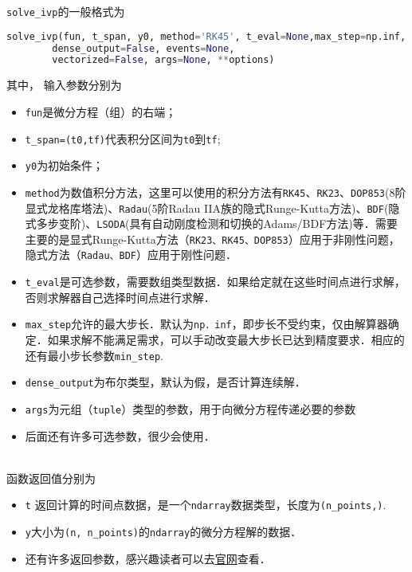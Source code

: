  \verb|solve_ivp|的一般格式为
 \begin{lstlisting}[language=python]
 solve_ivp(fun, t_span, y0, method='RK45', t_eval=None,max_step=np.inf,
        dense_output=False, events=None, 
        vectorized=False, args=None, **options)
 \end{lstlisting}
 其中， 输入参数分别为
\begin{itemize}
\item \verb|fun|是微分方程（组）的右端；
\item  \verb|t_span=(t0,tf)|代表积分区间为\verb|t0|到\verb|tf|;
\item  \verb|y0|为初始条件；
\item \verb|method|为数值积分方法，这里可以使用的积分方法有\verb|RK45|、\verb|RK23|、\verb|DOP853|(8阶显式龙格库塔法)、\verb|Radau|(5阶Radau IIA族的隐式Runge-Kutta方法)、\verb|BDF|(隐式多步变阶)、\verb|LSODA|(具有自动刚度检测和切换的Adams/BDF方法)等．需要主要的是显式Runge-Kutta方法（\verb|RK23、RK45、DOP853|）应用于非刚性问题，隐式方法（\verb|Radau、BDF|）应用于刚性问题．
\item \verb|t_eval|是可选参数，需要数组类型数据．如果给定就在这些时间点进行求解，否则求解器自己选择时间点进行求解．
\item \verb|max_step|允许的最大步长．默认为\verb|np．inf|，即步长不受约束，仅由解算器确定．如果求解不能满足需求，可以手动改变最大步长已达到精度要求．相应的还有最小步长参数\verb|min_step|.
\item \verb|dense_output|为布尔类型，默认为假，是否计算连续解．
\item \verb|args|为元组（\verb|tuple|）类型的参数，用于向微分方程传递必要的参数
\item 后面还有许多可选参数，很少会使用．
\end{itemize}
\\
函数返回值分别为
\begin{itemize}
\item  \verb|t| 返回计算的时间点数据，是一个\verb|ndarray|数据类型，长度为\verb|(n_points,)|.
\item \verb|y|大小为\verb|(n, n_points)|的\verb |ndarray|的微分方程解的数据．
\item 还有许多返回参数，感兴趣读者可以去\href{https://scipy.github.io/devdocs/reference/generated/scipy.integrate.solve_ivp.html#r179348322575-7}{官网}查看．
\end{itemize}


